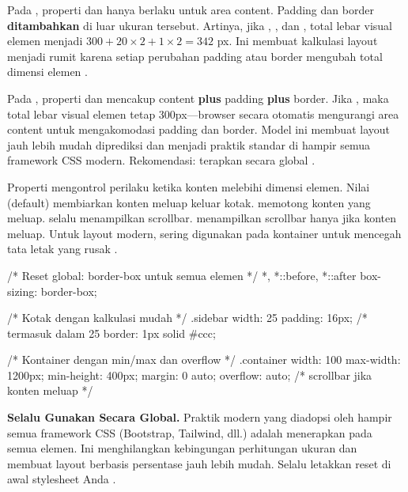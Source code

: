 Pada , properti  dan  hanya berlaku untuk area content. Padding dan border \textbf{ditambahkan} di luar ukuran tersebut. Artinya, jika , , dan , total lebar visual elemen menjadi $300 + 20 \times 2 + 1 \times 2 = 342$ px. Ini membuat kalkulasi layout menjadi rumit karena setiap perubahan padding atau border mengubah total dimensi elemen \cite{cssTricks}.

Pada , properti  dan  mencakup content \textbf{plus} padding \textbf{plus} border. Jika , maka total lebar visual elemen tetap 300px---browser secara otomatis mengurangi area content untuk mengakomodasi padding dan border. Model ini membuat layout jauh lebih mudah diprediksi dan menjadi praktik standar di hampir semua framework CSS modern. Rekomendasi: terapkan  secara global \cite{webdevCss}.

Properti  mengontrol perilaku ketika konten melebihi dimensi elemen. Nilai  (default) membiarkan konten meluap keluar kotak.  memotong konten yang meluap.  selalu menampilkan scrollbar.  menampilkan scrollbar hanya jika konten meluap. Untuk layout modern,  sering digunakan pada kontainer untuk mencegah tata letak yang rusak \cite{mdnCss}.

\begin{webcode}[language=CSS, caption={box-sizing global dan overflow}]
/* Reset global: border-box untuk semua elemen */
*, *::before, *::after {
  box-sizing: border-box;
}

/* Kotak dengan kalkulasi mudah */
.sidebar {
  width: 25%
  padding: 16px;    /* termasuk dalam 25%
  border: 1px solid #ccc;
}

/* Kontainer dengan min/max dan overflow */
.container {
  width: 100%
  max-width: 1200px;
  min-height: 400px;
  margin: 0 auto;
  overflow: auto;   /* scrollbar jika konten meluap */
}
\end{webcode}

\begin{konsep}
\textbf{Selalu Gunakan  Secara Global.} Praktik modern yang diadopsi oleh hampir semua framework CSS (Bootstrap, Tailwind, dll.) adalah menerapkan  pada semua elemen. Ini menghilangkan kebingungan perhitungan ukuran dan membuat layout berbasis persentase jauh lebih mudah. Selalu letakkan reset  di awal stylesheet Anda \cite{cssTricks}.
\end{konsep}

